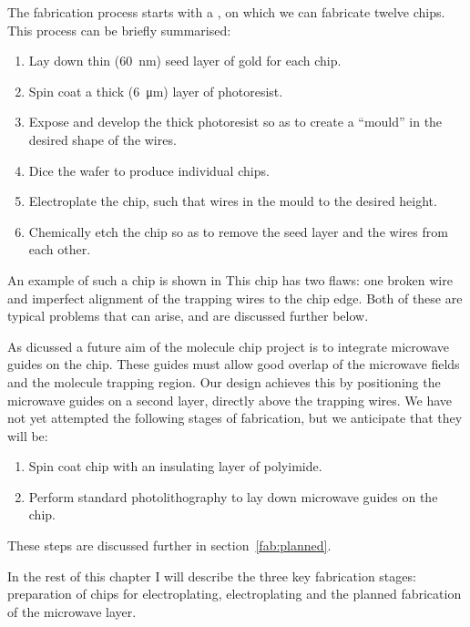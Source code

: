The fabrication process starts with a ,
on which we can fabricate twelve  chips. This process can be
briefly summarised:
\begin{enumerate}
\item Lay down thin (\SI{60}{\nano\meter}) seed layer of gold for each chip.
\item Spin coat a thick (\SI{6}{\micro\meter}) layer of photoresist.
\item Expose and develop the thick photoresist so as to create a ``mould''
in the desired shape of the wires.
\item Dice the wafer to produce individual chips.
\item Electroplate the chip, such that wires  in the mould to the
desired height.
\item Chemically etch the chip so as to remove the seed layer and
   the wires from each other.
\end{enumerate}

An example of such a chip is shown in  This chip has two flaws: one broken wire
 and imperfect alignment of the trapping wires
to the chip edge. Both of these are typical problems that can arise, and are
discussed further below.

As dicussed  a future aim of the molecule chip project is to
integrate microwave guides on the chip. These guides must allow good overlap of
the microwave fields and the molecule trapping region. Our design achieves this
by positioning the microwave guides on a second layer, directly above the
trapping wires.  We have not yet attempted the following stages of
fabrication, but we anticipate that they will be:
\begin{enumerate}[resume]
    \item Spin coat chip with an insulating layer of polyimide.
    \item Perform standard photolithography to lay down microwave guides on the
      chip.
\end{enumerate}
These steps are discussed further in section~\ref{fab:planned}.

In the rest of this chapter I will describe the three key fabrication stages:
preparation of chips for electroplating, electroplating and the planned
fabrication of the microwave layer.

